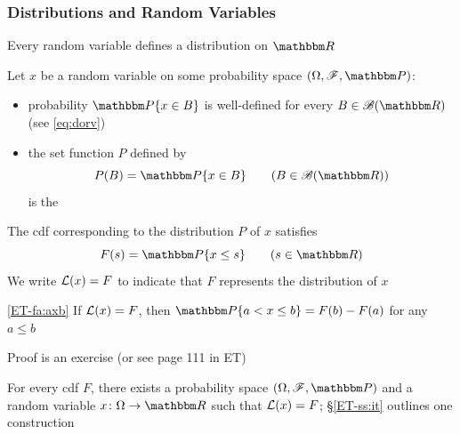 \begin{frame}\frametitle{Distributions and Random Variables}

    \vspace{2em}
    Every random
    variable defines a distribution on $\RR$ 
    
    \vspace{.7em}
    Let $x$ be a random variable on some probability space $(\Omega,\fF, \PP)$:
    \begin{itemize}
        \item  probability $\PP\{x \in B\}$ is well-defined
        for every $B \in \bB(\RR)$ (see \eqref{eq:dorv})
        \item  the set function $P$ defined by
            \begin{equation}
                \label{eq:pidox}
                P(B) = \PP\{x \in B\} 
                \qquad (B \in \bB(\RR))
            \end{equation}
            is the 
    \end{itemize}
    
\end{frame}

\begin{frame}

    \vspace{2em}
    The  {\sc cdf} corresponding to the distribution $P$ of $x$ satisfies
    \begin{equation}
        \label{eq:deffx}
        F(s) = \PP \{x \leq s\}
        \qquad (s \in \RR)
    \end{equation}
    We write $\mathcal L(x) = F$ to indicate that $F$ represents the distribution of $x$
    
    \vspace{.7em}
    \Fact\eqref{ET-fa:axb}
    If $\mathcal L(x)= F$, then $\PP\{a < x \leq b\} = F(b) - F(a)$ for any $a \leq b$
    
    Proof is an exercise (or see page 111 in ET) 
    
\end{frame}

\begin{frame}

    \vspace{2em}
    For every {\sc cdf} $F$, there exists a probability
    space $(\Omega, \fF, \PP)$ and a random variable $x \colon \Omega \to \RR$
    such that $\mathcal L(x) = F$;  \S\ref{ET-ss:it} outlines one construction
    
\end{frame}

